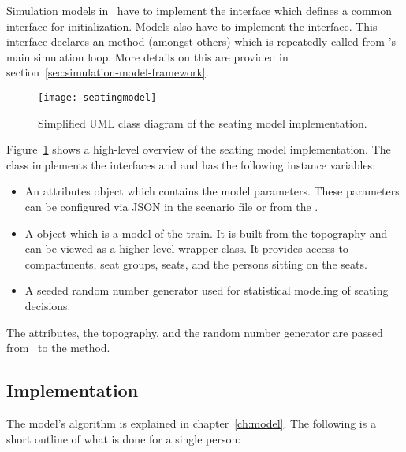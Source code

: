 Simulation models in \vadere\ have to implement the  interface
which defines a common interface for initialization.
Models also have to implement the  interface.
This interface declares an  method (amongst others) which is
repeatedly called from \vadere's main simulation loop.
More details on this are provided in section~\ref{sec:simulation-model-framework}.

\begin{figure}[htb]
  \centering
  \texttt{[image: seatingmodel]}
  \caption[Simplified \acs{UML} class diagram of the seating model implementation.]{%
  Simplified \acs{UML} class diagram of the seating model implementation.
  }\label{fig:uml-seatingmodel}
\end{figure}

Figure~\ref{fig:uml-seatingmodel} shows a high-level overview of the seating
model implementation.
The class  implements the interfaces  and
 and has the following instance variables:

\begin{itemize}[noitemsep,nolistsep]

  \item An attributes object which contains the model parameters.
    These parameters can be configured via \acs{JSON} in the scenario file or
    from the \vaderegui.

  \item A  object which is a model of the train.
    It is built from the topography and can be viewed as a higher-level wrapper
    class.
    It provides access to compartments, seat groups, seats, and the persons
    sitting on the seats.

  \item A seeded random number generator used for statistical modeling of
    seating decisions.

\end{itemize}

The attributes, the topography, and the random number generator are passed from
\vadere\ to the  method.

\subsection{Implementation}

The model's algorithm is explained in chapter~\ref{ch:model}.
The following is a short outline of what is done for a single person:

